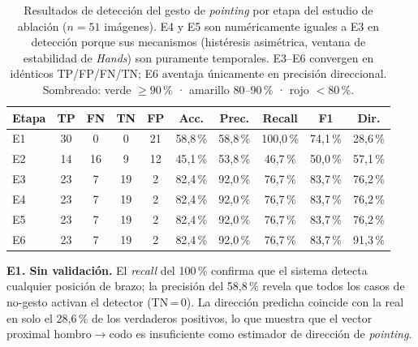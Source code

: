 \documentclass[12pt]{report} %
\begin{document}
\begin{table}[H]
\caption{\label{tab:heuristica}Resultados de detección del gesto de \textit{pointing} por etapa del estudio de ablación ($n = 51$ imágenes). E4 y E5 son numéricamente iguales a E3 en detección porque sus mecanismos (histéresis asimétrica, ventana de estabilidad de \textit{Hands}) son puramente temporales. E3--E6 convergen en idénticos TP/FP/FN/TN; E6 aventaja únicamente en precisión direccional. Sombreado: \colorbox{green!25}{verde} $\geq 90$\,\% · \colorbox{yellow!35}{amarillo} 80--90\,\% · \colorbox{red!20}{rojo} $< 80$\,\%.}
{\small
\begin{tabular}{lccccccccc}
\hline
\textbf{Etapa} & \textbf{TP} & \textbf{FN} & \textbf{TN} & \textbf{FP} & \textbf{Acc.} & \textbf{Prec.} & \textbf{Recall} & \textbf{F1} & \textbf{Dir.} \\
\hline
E1 & 30 &  0 &  0 & 21 & \cellcolor{red!20}58{,}8\,\% & \cellcolor{red!20}58{,}8\,\% & \cellcolor{green!25}100{,}0\,\% & \cellcolor{red!20}74{,}1\,\% & \cellcolor{red!20}28{,}6\,\% \\
E2 & 14 & 16 &  9 & 12 & \cellcolor{red!20}45{,}1\,\% & \cellcolor{red!20}53{,}8\,\% & \cellcolor{red!20}46{,}7\,\%   & \cellcolor{red!20}50{,}0\,\% & \cellcolor{red!20}57{,}1\,\% \\
E3 & 23 &  7 & 19 &  2 & \cellcolor{yellow!35}82{,}4\,\% & \cellcolor{green!25}92{,}0\,\% & \cellcolor{red!20}76{,}7\,\%  & \cellcolor{yellow!35}83{,}7\,\% & \cellcolor{red!20}76{,}2\,\% \\
E4 & 23 &  7 & 19 &  2 & \cellcolor{yellow!35}82{,}4\,\% & \cellcolor{green!25}92{,}0\,\% & \cellcolor{red!20}76{,}7\,\%  & \cellcolor{yellow!35}83{,}7\,\% & \cellcolor{red!20}76{,}2\,\% \\
E5 & 23 &  7 & 19 &  2 & \cellcolor{yellow!35}82{,}4\,\% & \cellcolor{green!25}92{,}0\,\% & \cellcolor{red!20}76{,}7\,\%  & \cellcolor{yellow!35}83{,}7\,\% & \cellcolor{red!20}76{,}2\,\% \\
E6 & 23 &  7 & 19 &  2 & \cellcolor{yellow!35}82{,}4\,\% & \cellcolor{green!25}92{,}0\,\% & \cellcolor{red!20}76{,}7\,\%  & \cellcolor{yellow!35}83{,}7\,\% & \cellcolor{green!25}91{,}3\,\% \\
\hline
\end{tabular}
}
\end{table}

\textbf{E1. Sin validación.} El \textit{recall} del 100\,\% confirma que el sistema detecta cualquier posición de brazo; la precisión del 58{,}8\,\% revela que todos los casos de no-gesto activan el detector (TN\,=\,0). La dirección predicha coincide con la real en solo el 28{,}6\,\% de los verdaderos positivos, lo que muestra que el vector proximal hombro$\to$codo es insuficiente como estimador de dirección de \textit{pointing}.
\end{document}
